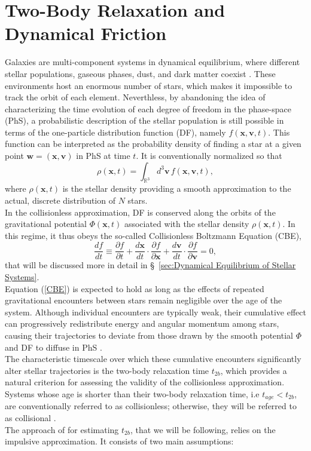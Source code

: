 \documentclass[12pt,twoside,openany]{book}
\begin{document}
\section{Two-Body Relaxation and Dynamical Friction}
\label{sec:Two-Body Relaxation and Dynamical Friction}
Galaxies are multi-component systems in dynamical equilibrium, where different stellar populations, gaseous phases, dust, and dark matter coexist \parencite{Cimatti_book}. These environments host an enormous number of stars, which makes it impossible to track the orbit of each element. Neverthless, by abandoning the idea of characterizing the time evolution of each degree of freedom in the phase-space (PhS), a probabilistic description of the stellar population is still possible in terms of the one-particle distribution function (DF), namely $f(\mathbf{x},\mathbf{v},t)$. This function can be interpreted as the probability density of finding a star at a given point $\mathbf{w}=(\mathbf{x},\mathbf{v})$ in PhS at time $t$. It is conventionally normalized so that
\begin{equation}
\rho(\mathbf{x},t)=\int_{\mathbb{R}^3}d^3\mathbf{v}\,f(\mathbf{x},\mathbf{v},t),
\end{equation}
where $\rho(\mathbf{x},t)$ is the stellar density providing a smooth approximation to the actual, discrete distribution of $N$ stars.\\In the collisionless approximation, DF is conserved along the orbits of the gravitational potential $\Phi(\mathbf{x},t)$ associated with the stellar density $\rho(\mathbf{x},t)$. In this regime, it thus obeys the so-called Collisionless Boltzmann Equation (CBE),
\begin{equation}\label{CBE}
\frac{df}{dt}\equiv \frac{\partial f}{\partial t}+\frac{d\mathbf{x}}{dt}\cdot \frac{\partial f}{\partial \mathbf{x}}+\frac{d\mathbf{v}}{dt}\cdot \frac{\partial f}{\partial \mathbf{v}}=0,
\end{equation}
that will be discussed more in detail in \S~\ref{sec:Dynamical Equilibrium of Stellar Systems}.\\Equation (\ref{CBE}) is expected to hold as long as the effects of repeated gravitational encounters between stars remain negligible over the age of the system. Although individual encounters are typically weak, their cumulative effect can progressively redistribute energy and angular momentum among stars, causing their trajectories to deviate from those drawn by the smooth potential $\Phi$ and DF to diffuse in PhS \parencite{Binney_book}.\\The characteristic timescale over which these cumulative encounters significantly alter stellar trajectories is the two-body relaxation time $t_{2b}$, which provides a natural criterion for assessing the validity of the collisionless approximation. Systems whose age is shorter than their two-body relaxation time, i.e $t_{age}<t_{2b}$, are conventionally referred to as collisionless; otherwise, they will be referred to as collisional \parencite{Ciotti_book}.\\The approach of \textcite{Chandrasekhar_1943} for estimating $t_{2b}$, that we will be following, relies on the impulsive approximation. It consists of two main assumptions:
\end{document}
